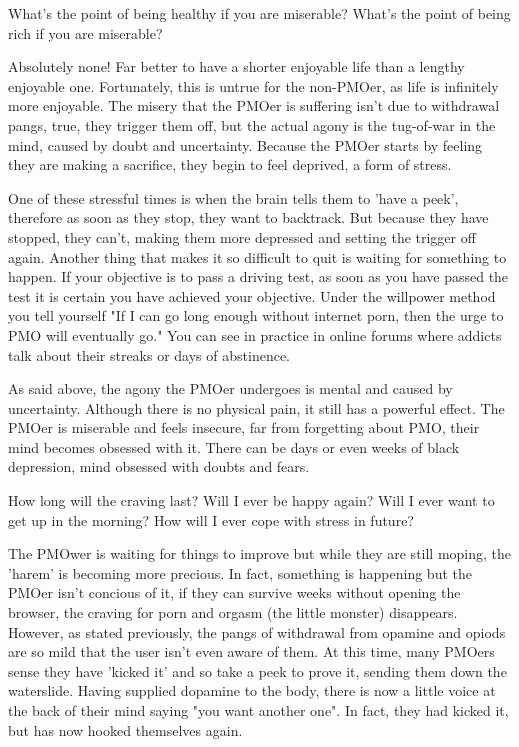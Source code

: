   What's the point of being healthy if you are miserable?
  What's the point of being rich if you are miserable?

Absolutely none! Far better to have a shorter enjoyable life than a lengthy enjoyable one. Fortunately, this is untrue for the non-PMOer, as life is infinitely more enjoyable. The misery that the PMOer is suffering isn't due to withdrawal pangs, true, they trigger them off, but the actual agony is the tug-of-war in the mind, caused by doubt and uncertainty. Because the PMOer starts by feeling they are making a sacrifice, they begin to feel deprived, a form of stress.

One of these stressful times is when the brain tells them to 'have a peek', therefore as soon as they stop, they want to backtrack. But because they have stopped, they can't, making them more depressed and setting the trigger off again. Another thing that makes it so difficult to quit is waiting for something to happen. If your objective is to pass a driving test, as soon as you have passed the test it is certain you have achieved your objective. Under the willpower method you tell yourself "If I can go long enough without internet porn, then the urge to PMO will eventually go." You can see in practice in online forums where addicts talk about their streaks or days of abstinence.

As said above, the agony the PMOer undergoes is mental and caused by uncertainty. Although there is no physical pain, it still has a powerful effect. The PMOer is miserable and feels insecure, far from forgetting about PMO, their mind becomes obsessed with it. There can be days or even weeks of black depression, mind obsessed with doubts and fears.

  How long will the craving last?
  Will I ever be happy again?
  Will I ever want to get up in the morning?
  How will I ever cope with stress in future?

The PMOwer is waiting for things to improve but while they are still moping, the 'harem' is becoming more precious. In fact, something is happening but the PMOer isn't concious of it, if they can survive weeks without opening the browser, the craving for porn and orgasm (the little monster) disappears. However, as stated previously, the pangs of withdrawal from opamine and opiods are so mild that the user isn't even aware of them. At this time, many PMOers sense they have 'kicked it' and so take a peek to prove it, sending them down the waterslide. Having supplied dopamine to the body, there is now a little voice at the back of their mind saying "you want another one". In fact, they had kicked it, but has now hooked themselves again.

